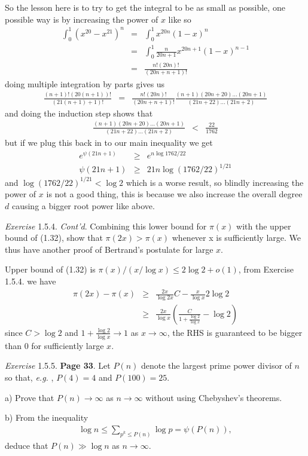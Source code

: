\documentclass[aps,preprint,preprintnumbers,nofootinbib,showpacs,prd]{revtex4-1}
\newcommand{\eg}{{\it e.g.} }
\newcommand{\nbea}{\begin{eqnarray*}}
\newcommand{\neea}{\end{eqnarray*}}
\begin{document}
So the lesson here is to try to get the integral to be as small as possible, one possible way is by increasing the power of $x$ like so
%
\nbea
\int_0^1 (x^{20} - x^{21})^{n} & = & \int_0^1 x^{20n} (1-x)^{n} \\
& = & \int_0^1 \frac{n}{20n + 1} x^{20n+1} (1-x)^{n-1} \\
& = & \frac{n!(20n)!}{(20n + n + 1)!}
\neea
%
doing multiple integration by parts gives us
%
\nbea
\frac{(n+1)!(20(n+1))!}{(21(n + 1) + 1)!} & = & \frac{n!(20n)!}{(20n + n + 1)!} \frac{(n+1)(20n+20)\dots(20n+1)}{(21n + 22)\dots(21n + 2)}
\neea
%
and doing the induction step shows that
%
\nbea
\frac{(n+1)(20n+20)\dots(20n+1)}{(21n + 22)\dots(21n + 2)} & < & \frac{22}{1762}
\neea
%
but if we plug this back in to our main inequality we get
%
\nbea
e^{\psi(21n+1)} & \ge & e^{n\log 1762/22} \\
\psi(21n+1) & \ge & 21n \log (1762/22)^{1/21}
\neea
%
and $\log (1762/22)^{1/21} < \log 2$ which is a worse result, so blindly increasing the power of $x$ is not a good thing, this is because we also increase the overall degree $d$ causing a bigger root power like above.

{\it Exercise} 1.5.4. {\it Cont'd}. Combining this lower bound for $\pi(x)$ with the upper bound of (1.32), show that $\pi(2x) > \pi(x)$ whenever x is suﬃciently large. We thus have another proof of Bertrand’s postulate for large $x$.

Upper bound of (1.32) is $\pi(x)/(x/\log x) \le 2 \log 2 + o(1)$, from Exercise 1.5.4. we have
%
\nbea
\pi(2x)  - \pi(x) & \ge & \frac{2x}{\log 2x} C - \frac{x}{\log x} 2 \log 2 \\
& \ge & \frac{2x}{\log x} \left ( \frac{C}{1 + \frac{\log 2}{\log x}} -\log 2\right )
\neea
%
since $C > \log 2$ and $1 + \frac{\log 2}{\log x} \to 1$ as $x\to\infty$, the RHS is guaranteed to be bigger than 0 for sufficiently large $x$.

{\it Exercise} 1.5.5. {\bf Page 33}. Let $P(n)$ denote the largest prime power divisor of $n$ so that, \eg, $P(4) = 4$ and $P(100) = 25$.

a) Prove that $P(n) \to \infty$ as $n \to \infty$ without using Chebyshev’s theorems.

b) From the inequality
%
\nbea
\log n \le \sum_{p^k \le P(n)} \log p = \psi(P (n)),
\neea
%
deduce that $P(n) \gg \log n$ as $n \to \infty$.
\end{document}
